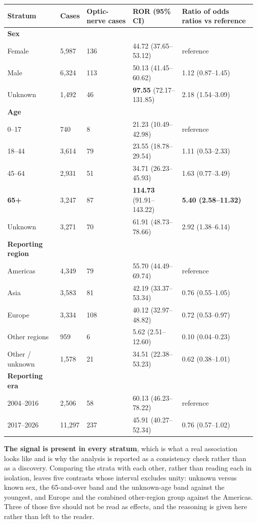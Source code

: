 \documentclass[utf8]{FrontiersinVancouver}
\begin{document}
\begin{table}[htbp]
\centering
\begin{tabular}{lllll}
\hline
Stratum & Cases & Optic-nerve cases & ROR (95\% CI) & Ratio of odds ratios vs reference \\
\hline
\textbf{Sex} &  &  &  &  \\
Female & 5,987 & 136 & 44.72 (37.65--53.12) & reference \\
Male & 6,324 & 113 & 50.13 (41.45--60.62) & 1.12 (0.87--1.45) \\
Unknown & 1,492 & 46 & \textbf{97.55} (72.17--131.85) & 2.18 (1.54--3.09) \\
\textbf{Age} &  &  &  &  \\
0--17 & 740 & 8 & 21.23 (10.49--42.98) & reference \\
18--44 & 3,614 & 79 & 23.55 (18.78--29.54) & 1.11 (0.53--2.33) \\
45--64 & 2,931 & 51 & 34.71 (26.23--45.93) & 1.63 (0.77--3.49) \\
\textbf{65+} & 3,247 & 87 & \textbf{114.73} (91.91--143.22) & \textbf{5.40 (2.58--11.32)} \\
Unknown & 3,271 & 70 & 61.91 (48.73--78.66) & 2.92 (1.38--6.14) \\
\textbf{Reporting region} &  &  &  &  \\
Americas & 4,349 & 79 & 55.70 (44.49--69.74) & reference \\
Asia & 3,583 & 81 & 42.19 (33.37--53.34) & 0.76 (0.55--1.05) \\
Europe & 3,334 & 108 & 40.12 (32.97--48.82) & 0.72 (0.53--0.97) \\
Other regions & 959 & 6 & 5.62 (2.51--12.60) & 0.10 (0.04--0.23) \\
Other / unknown & 1,578 & 21 & 34.51 (22.38--53.23) & 0.62 (0.38--1.01) \\
\textbf{Reporting era} &  &  &  &  \\
2004--2016 & 2,506 & 58 & 60.13 (46.23--78.22) & reference \\
2017--2026 & 11,297 & 237 & 45.91 (40.27--52.34) & 0.76 (0.57--1.02) \\
\hline
\end{tabular}
\end{table}

\textbf{The signal is present in every stratum}, which is what a real association looks like and is why the analysis is reported as a consistency check rather than as a discovery. Comparing the strata with each other, rather than reading each in isolation, leaves five contrasts whose interval excludes unity: unknown versus known sex, the 65-and-over band and the unknown-age band against the youngest, and Europe and the combined other-region group against the Americas. Three of those five should not be read as effects, and the reasoning is given here rather than left to the reader.
\end{document}

